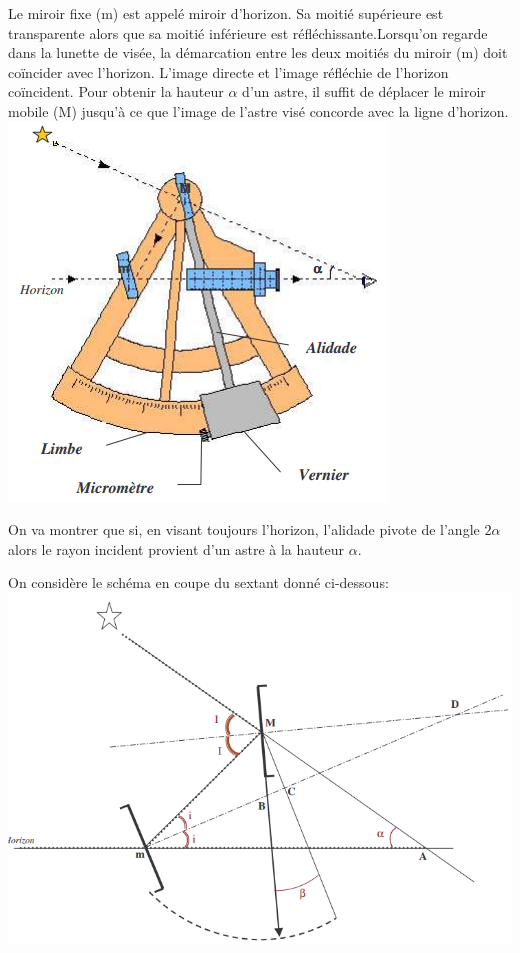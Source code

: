 \begin{multicols}{2}
\begin{enumerate}
Le miroir fixe (m) est appelé miroir d'horizon. Sa moitié supérieure est transparente alors que sa moitié inférieure est réfléchissante.Lorsqu'on regarde dans la lunette de visée, la démarcation entre les deux moitiés du miroir (m) doit coïncider avec l'horizon. L'image directe et l'image réfléchie de l'horizon coïncident. Pour obtenir la hauteur $\alpha$ d'un astre, il suffit de déplacer le miroir mobile (M) jusqu'à ce que l'image de l'astre visé concorde avec la ligne d'horizon.\\

\includegraphics[scale=0.8]{RepE-sextant.png}


On va montrer que si, en visant toujours l'horizon, l'alidade pivote de l'angle
$2 \alpha$ alors le rayon incident
provient d'un astre à la hauteur $\alpha$.

\medskip

On considère le schéma en coupe du sextant donné ci-dessous:\\

\includegraphics[scale=0.5]{RepE-schemacoupesextant.png} 


\end{enumerate}
\end{multicols}
